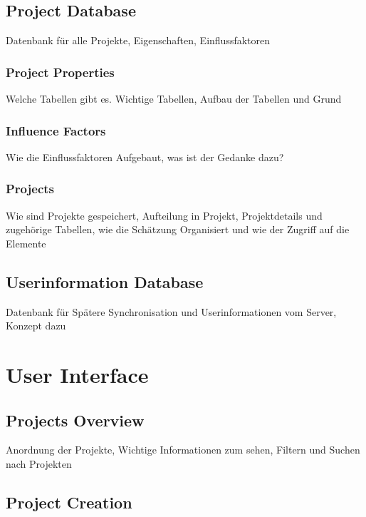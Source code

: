 \subsection{Project Database}

Datenbank für alle Projekte, Eigenschaften, Einflussfaktoren

\subsubsection{Project Properties}

Welche Tabellen gibt es. Wichtige Tabellen, Aufbau der Tabellen und Grund

\subsubsection{Influence Factors}

Wie die Einflussfaktoren Aufgebaut, was ist der Gedanke dazu?

\subsubsection{Projects}

Wie sind Projekte gespeichert, Aufteilung in Projekt, Projektdetails und zugehörige Tabellen, wie die Schätzung Organisiert und wie der Zugriff auf die Elemente

\subsection{Userinformation Database}

Datenbank für Spätere Synchronisation und Userinformationen vom Server, Konzept dazu

\section{User Interface}

\subsection{Projects Overview}

Anordnung der Projekte, Wichtige Informationen zum sehen, Filtern und Suchen nach Projekten

\subsection{Project Creation}


